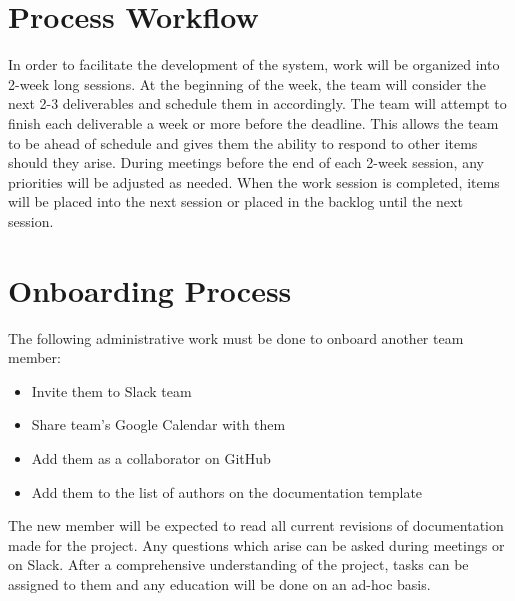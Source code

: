 \documentclass[11pt]{article}
\begin{document}
\section{Process Workflow}
In order to facilitate the development of the system, work will be organized into 2-week long sessions. At the beginning of the week, the team will consider the next 2-3 deliverables and schedule them in accordingly. The team will attempt to finish each deliverable a week or more before the deadline. This allows the team to be ahead of schedule and gives them the ability to respond to other items should they arise. During meetings before the end of each 2-week session, any priorities will be adjusted as needed. When the work session is completed, items will be placed into the next session or placed in the backlog until the next session.
\section{Onboarding Process}
The following administrative work must be done to onboard another team member:
\begin{itemize}
\item Invite them to Slack team
\item Share team's Google Calendar with them
\item Add them as a collaborator on GitHub
\item Add them to the list of authors on the documentation template
\end{itemize}
The new member will be expected to read all current revisions of documentation made for the project. Any questions which arise can be asked during meetings or on Slack. After a comprehensive understanding of the project, tasks can be assigned to them and any education will be done on an ad-hoc basis.
\end{document}
